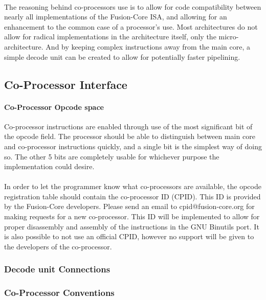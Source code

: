 \documentclass[letterpaper, 11pt]{article}
\begin{document}
\paragraph{} The reasoning behind co-processors use is to allow for code compatibility between nearly all implementations of the Fusion-Core ISA, and
allowing for an enhancement to the common case of a processor's use. Most architectures do not allow for radical implementations in the architecture itself,
only the micro-architecture. And by keeping complex instructions away from the main core, a simple decode unit can be created to allow for potentially faster
pipelining. 

\subsection{ Co-Processor Interface}

\paragraph{ Co-Processor Opcode space} Co-processor instructions are enabled through use of the most significant bit of the opcode field. 
The processor should be able to distinguish between main core and co-processor instructions quickly, and a single bit is the simplest way of doing so.
The other 5 bits are completely usable for whichever purpose the implementation could desire.

\paragraph{} In order to let the programmer know what co-processors are available, the opcode registration table should contain the co-processor ID (CPID).
This ID is provided by the Fusion-Core developers. Please send an email to cpid@fusion-core.org for making requests for a new co-processor.
This ID will be implemented to allow for proper disassembly and assembly of the instructions in the GNU Binutils port. It is also possible to not use an official
CPID, however no support will be given to the developers of the co-processor.

\subsubsection{ Decode unit Connections}
\subsubsection{ Co-Processor Conventions}
\end{document}
